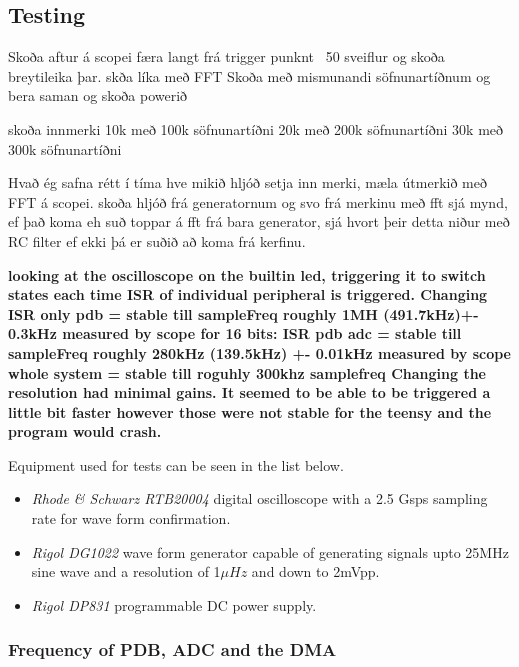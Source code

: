 \subsection{Testing}



Skoða aftur á scopei færa langt frá trigger punknt ~50 sveiflur og skoða breytileika þar.
skða líka með FFT
Skoða með mismunandi söfnunartíðnum og bera saman og skoða powerið

skoða innmerki  10k með 100k söfnunartíðni
                20k með 200k söfnunartíðni
                30k með 300k söfnunartíðni

Hvað ég safna rétt í tíma
hve mikið hljóð
setja inn merki, mæla útmerkið með FFT á scopei.
skoða hljóð frá generatornum og svo frá merkinu með fft
sjá mynd, ef það koma eh suð toppar á fft frá bara generator, sjá hvort þeir detta niður með RC filter ef ekki þá er suðið að koma frá kerfinu.



\textbf{looking at the oscilloscope on the builtin led, triggering it to switch states each time ISR of individual peripheral is triggered. 
Changing ISR only pdb = stable till sampleFreq  roughly 1MH  (491.7kHz)+- 0.3kHz measured by scope
for 16 bits:
ISR pdb adc = stable till sampleFreq roughly 280kHz   (139.5kHz) +- 0.01kHz measured by scope
whole system = stable till roguhly 300khz samplefreq 
Changing the resolution had minimal gains.
It seemed to be able to be triggered a little bit faster however those were not stable for the teensy and the program would crash.}


Equipment used for tests can be seen in the list below.
\begin{itemize}
    \item \textit{Rhode \& Schwarz RTB20004} digital oscilloscope with a 2.5 Gsps sampling rate for wave form confirmation.
    \item \textit{Rigol DG1022} wave form generator capable of generating signals upto 25MHz sine wave and a resolution of 1$\mu Hz$ and down to 2mVpp.
    \item \textit{Rigol DP831} programmable DC power supply.
\end{itemize}



\subsubsection{Frequency of PDB, ADC and the DMA}

